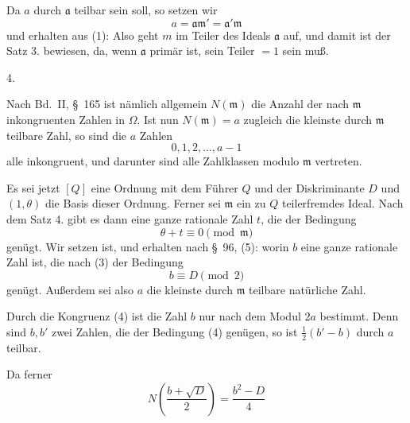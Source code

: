 
Da $a$ durch $\mathfrak{a}$ teilbar sein soll, so setzen wir
\[ a = \mathfrak{a}\mathfrak{m}' = \mathfrak{a}'\mathfrak{m} \]
und erhalten aus (1):
Also geht $m$ im Teiler des Ideals $\mathfrak{a}$ auf, und damit ist der Satz 3. bewiesen, da, wenn $\mathfrak{a}$ primär ist, sein Teiler $= 1$ sein muß.

4. 

Nach Bd.\ II, \S\ 165 ist nämlich allgemein $N(\mathfrak{m})$ die Anzahl der nach $\mathfrak{m}$ inkongruenten Zahlen in $\Omega$. Ist nun $N(\mathfrak{m}) = a$ zugleich die kleinste durch $\mathfrak{m}$ teilbare  Zahl, so sind die $a$ Zahlen
\[ 0, 1, 2, \ldots, a - 1 \]
alle inkongruent, und darunter sind alle Zahlklassen modulo $\mathfrak{m}$ vertreten.

Es sei jetzt $[Q]$ eine Ordnung mit dem Führer $Q$ und der Diskriminante $D$ und $(1, \theta)$ die Basis dieser Ordnung. Ferner sei $\mathfrak{m}$ ein  zu $Q$ teilerfremdes Ideal. Nach dem Satz 4. gibt es dann eine ganze rationale Zahl $t$, die der Bedingung
\[ \theta + t \equiv 0 \pmod{\mathfrak{m}} \]
genügt. Wir setzen
ist, und erhalten nach \S\ 96, (5):
worin $b$ eine ganze rationale Zahl ist, die nach (3) der Bedingung
\[ b \equiv D \pmod{2} \]
genügt. Außerdem sei
also $a$ die kleinste durch $\mathfrak{m}$ teilbare natürliche Zahl.

Durch die Kongruenz (4) ist die Zahl $b$ nur nach dem Modul $2a$ bestimmt. Denn sind $b, b'$ zwei Zahlen, die der Bedingung (4) genügen, so ist $\frac{1}{2}(b' - b)$ durch $a$ teilbar.

Da ferner
\[ N\left(\frac{b + \sqrt{D}}{2}\right) = \frac{b^2 - D}{4} \]
